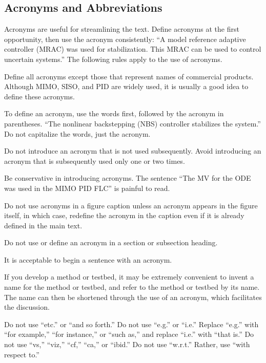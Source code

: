 \subsection{Acronyms and Abbreviations}
Acronyms are useful for streamlining the text.  Define acronyms at the first opportunity, then use the acronym consistently:  
``A model reference adaptive controller (MRAC) was used for stabilization.  This MRAC can be used to control uncertain systems.''
The following rules apply to the use of acronyms.
\bee
\item  Define all acronyms except those that represent names of commercial products.  Although MIMO, SISO, and PID are widely used, it is usually a good idea to define these acronyms.

\item  To define an acronym, use the words first, followed by the acronym in parentheses.  ``The nonlinear backstepping (NBS) controller stabilizes the system.''  Do not capitalize the words, just the acronym.

\item  Do not introduce an acronym that is not used subsequently. Avoid introducing an acronym that is subsequently used only one or two times.

\item  Be conservative in introducing acronyms.  The sentence ``The MV for the ODE was used in the MIMO PID FLC'' is painful to read.

\item  Do not use acronyms in a figure caption unless an acronym appears in the figure itself, in which case, redefine the acronym in the caption even if it is already defined in the main text.

\item  Do not use or define an acronym in a section or subsection heading.

\item  It is acceptable to begin a sentence with an acronym.

\item  If you develop a method or testbed, it may be extremely convenient to invent a name for the method or testbed, and refer to the method or testbed by its name.  The name can then be shortened through the use of an acronym, which facilitates the discussion.
\eee

Do not use ``etc.'' or ``and so forth.''  Do not use ``e.g.'' or ``i.e.''  Replace ``e.g.'' with ``for example,'' ``for instance,'' or ``such as,'' and replace ``i.e.'' with ``that is.'' 
%
Do not use ``vs,'' ``viz,'' ``cf,'' ``ca,'' or ``ibid.''
%
Do not use ``w.r.t.''  Rather, use ``with respect to.''

